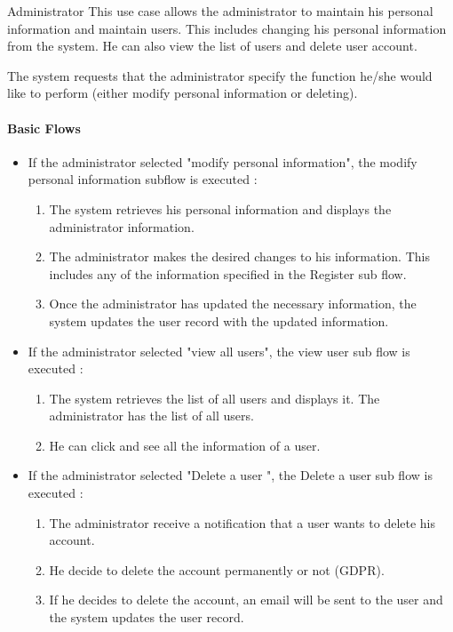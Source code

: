 \usecasedesc
{Administrator}
{
  This use case allows the administrator to maintain his personal information and maintain users. This includes changing his personal information from the system. He can also view the list of users and delete user account.
}
{
  The system requests that the administrator specify the function he/she would like to perform (either modify personal information or deleting).

  \paragraph{Basic Flows}
  \begin{itemize}
    \item If the administrator selected "modify personal information", the modify personal information subflow is executed :
    \begin{enumerate}
      \item The system retrieves his personal information and displays the administrator information.
      \item The administrator makes the desired changes to his information. This includes any of the information specified in the Register sub flow.
      \item Once the administrator has updated the necessary information, the system updates the user record with the updated information.
    \end{enumerate}
    \item If the administrator selected "view all users", the view user sub flow is executed :
    \begin{enumerate}
      \item The system retrieves the list of all users and displays it. The administrator has the list of all users.
      \item He can click and see all the information of a user.
    \end{enumerate}
    \item If the administrator selected "Delete a user ", the Delete a user sub flow is executed :
    \begin{enumerate}
      \item The administrator receive a notification that a user wants to delete his account.
      \item He decide to delete the account permanently or not (GDPR).
      \item If he decides to delete the account, an email will be sent to the user and the system updates the user record.
    \end{enumerate}


\end{itemize}}
